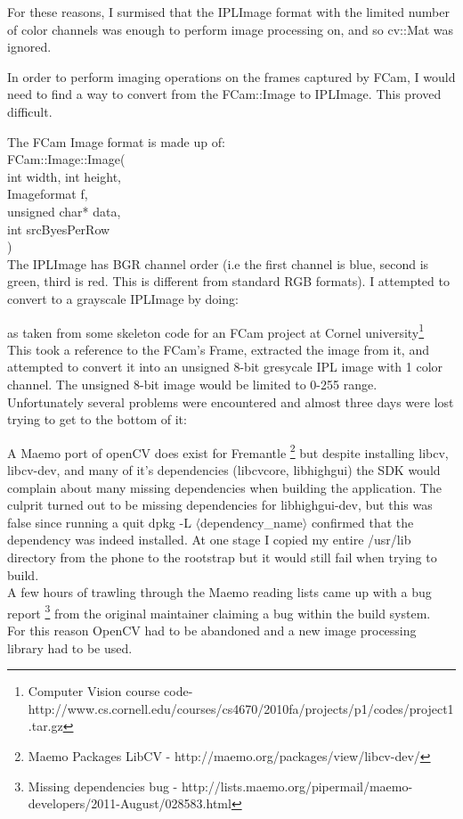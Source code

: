 \documentclass[11pt]{article} %
\newcommand{\tab}{\hspace*{2em}}
\begin{document}
For these reasons, I surmised that the IPLImage format with the limited number of color channels was enough to perform image processing on, and so cv::Mat was ignored.

In order to perform imaging operations on the frames captured by FCam, I would need to find a way to convert from the FCam::Image to IPLImage. This proved difficult.

The FCam Image format is made up of:\\
\tab FCam::Image::Image(\\
\tab\tab int width,  int height,\\
\tab\tab Imageformat f,\\
\tab\tab unsigned char* data,\\
\tab\tab int srcByesPerRow\\
)\\
The IPLImage has BGR channel order (i.e the first channel is blue, second is green, third is red. This is different from standard RGB formats). I attempted to convert to a grayscale IPLImage by doing:
\begin{frame}{}

\end{frame}
as taken from some skeleton code for an FCam project at Cornel university\footnote{Computer Vision course code- http://www.cs.cornell.edu/courses/cs4670/2010fa/projects/p1/codes/project1.tar.gz}\label{ref:snavelly}\\
This took a reference to the FCam's Frame, extracted the image from it, and attempted to convert it into an unsigned 8-bit gresycale IPL image with 1 color channel. The unsigned 8-bit image would be limited to 0-255 range.\\
Unfortunately several problems were encountered and almost three days were lost trying to get to the bottom of it:

A Maemo port of openCV does exist for Fremantle \footnote{Maemo Packages LibCV - http://maemo.org/packages/view/libcv-dev/}\label{ref:libcv} but despite installing libcv, libcv-dev, and many of it's dependencies (libcvcore, libhighgui) the SDK would complain about many missing dependencies when building the application. The culprit turned out to be missing dependencies for libhighgui-dev, but this was false since running a quit dpkg -L \(\langle\)dependency\_name\(\rangle\) confirmed that the dependency was indeed installed. At one stage I copied my entire /usr/lib directory from the phone to the rootstrap but it would still fail when trying to build.\\
A few hours of trawling through the Maemo reading lists came up with a bug report \footnote{Missing dependencies bug - http://lists.maemo.org/pipermail/maemo-developers/2011-August/028583.html}\label{ref:depbug} from the original maintainer claiming a bug within the build system.\\
For this reason OpenCV had to be abandoned and a new image processing library had to be used.
\end{document}
